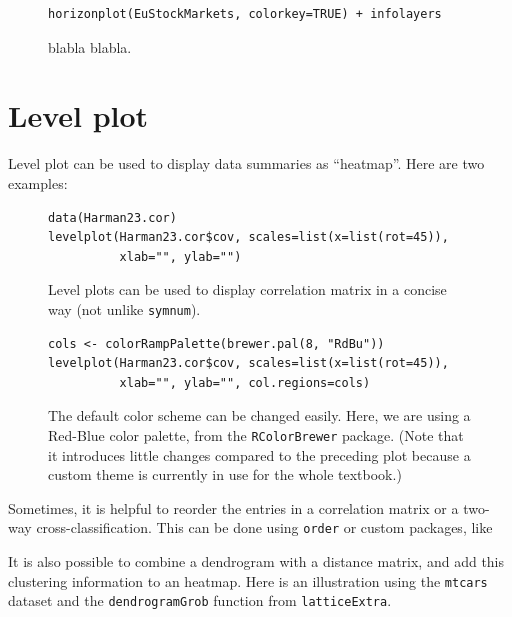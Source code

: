 \documentclass[a4paper,twoside]{book}
\newcounter{fig}
\newcommand{\img}[1]{\texttt{[image: \#1]}\stepcounter{fig}}
\renewcommand{\texttt}[1]{\lstinline{#1}}
\begin{document}
\begin{figure}[H]
\begin{lstlisting}
horizonplot(EuStockMarkets, colorkey=TRUE) + infolayers
\end{lstlisting}
  \fcapside[\FBwidth] {\img{figs_lattice-crop}}
  {\caption*{blabla blabla.}}
\end{figure}

\section{Level plot}

Level plot can be used to display data summaries as ``heatmap''. Here are
two examples:

\begin{figure}[H]
\begin{lstlisting}
data(Harman23.cor)
levelplot(Harman23.cor$cov, scales=list(x=list(rot=45)), 
          xlab="", ylab="")
\end{lstlisting}
  \fcapside[\FBwidth] {\img{figs_lattice-crop}}
  {\caption*{ Level plots can be used to
      display correlation matrix in a concise way (not unlike
      \texttt{symnum}).}} 
\end{figure}

\begin{figure}[H]
\begin{lstlisting}
cols <- colorRampPalette(brewer.pal(8, "RdBu"))
levelplot(Harman23.cor$cov, scales=list(x=list(rot=45)), 
          xlab="", ylab="", col.regions=cols)
\end{lstlisting}
  \fcapside[\FBwidth] {\img{figs_lattice-crop}}
  {\caption*{The default color scheme can be changed easily. Here,
      we are using a Red-Blue color palette, from the
      \texttt{RColorBrewer} package. (Note that it introduces little
      changes compared to the preceding plot because a custom theme is
    currently in use for the whole textbook.)}} 
\end{figure}

Sometimes, it is helpful to reorder the entries in a correlation matrix or a
two-way cross-classification. This can be done using \texttt{order} or
custom packages, like 


It is also possible to combine a dendrogram with a distance matrix, and add
this clustering information to an heatmap. Here is an illustration using the
\texttt{mtcars} dataset and the \texttt{dendrogramGrob} function from
\texttt{latticeExtra}. 
\end{document}
